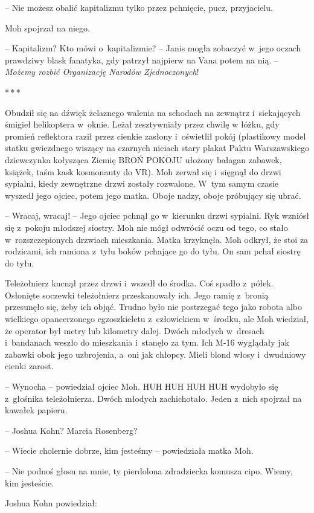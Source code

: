 \documentclass[oneside,polish,11pt,sfheadings]{mwbk}
\newcommand{\threeast}{\bigskip\par\centerline{*\,*\,*}\medskip\par}%
\begin{document}
-- Nie możesz obalić
kapitalizmu tylko przez pchnięcie, pucz, przyjacielu.

Moh spojrzał na niego. 

-- Kapitalizm? Kto mówi o~kapitalizmie? -- Janis
mogła zobaczyć w~jego oczach prawdziwy blask fanatyka, gdy patrzył
najpierw na Vana potem na nią. -- \emph{Możemy rozbić Organizację Narodów
Zjednoczonych}!

\threeast

Obudził się na dźwięk żelaznego walenia na schodach na zewnątrz i~siekających śmigieł helikoptera w~oknie. Leżał zesztywniały przez chwilę
w łóżku, gdy promień reflektora raził przez cienkie zasłony i~oświetlił
pokój (plastikowy model statku gwiezdnego wiszący na czarnych niciach
stary plakat Paktu Warszawskiego dziewczynka kołysząca Ziemię BROŃ
POKOJU ułożony bałagan zabawek, książek, taśm kask kosmonauty do VR).
Moh zerwał się i~sięgnął do drzwi sypialni, kiedy zewnętrzne drzwi
zostały rozwalone. W~tym samym czasie wyszedł jego ojciec, potem jego
matka. Oboje nadzy, oboje próbujący się ubrać.

-- Wracaj, wracaj! -- Jego ojciec pchnął go w~kierunku drzwi sypialni. Ryk
wzniósł się z~pokoju młodszej siostry. Moh nie mógł odwrócić oczu od
tego, co stało w~rozszczepionych drzwiach mieszkania. Matka krzyknęła.
Moh odkrył, że stoi za rodzicami, ich ramiona z~tyłu boków pchające go
do tyłu. On sam pchał siostrę do tyłu.

Teleżołnierz kucnął przez drzwi i~wszedł do środka. Coś spadło z~półek.
Osłonięte soczewki teleżołnierz przeskanowały ich. Jego ramię z~bronią
przesunęło się, żeby ich objąć. Trudno było nie postrzegać tego jako
robota albo wielkiego opancerzonego egzoszkieletu z~człowiekiem w~środku, ale Moh wiedział, że operator był metry lub kilometry dalej.
Dwóch młodych w~dresach i~bandanach weszło do mieszkania i~stanęło za
tym. Ich M-16 wyglądały jak zabawki obok jego uzbrojenia, a~oni jak
chłopcy. Mieli blond włosy i~dwudniowy cienki zarost.

-- Wynocha -- powiedział ojciec Moh. HUH HUH HUH HUH wydobyło się z~głośnika teleżołnierza. Dwóch młodych zachichotało. Jeden z~nich
spojrzał na kawałek papieru.

-- Joshua Kohn? Marcia Rosenberg?

-- Wiecie cholernie dobrze, kim jesteśmy -- powiedziała matka Moh.

-- Nie podnoś głosu na mnie, ty pierdolona zdradziecka komusza cipo.
Wiemy, kim jesteście.

Joshua Kohn powiedział: 
\end{document}
